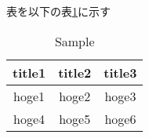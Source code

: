\documentclass[a4paper,10pt]{jsarticle}
\begin{document}
\noindent 表を以下の表\ref{tb:label2}に示す
\begin{table}[H]
    \caption{Sample}
    \label{tb:label2}                 
    \centering                     
    \begin{tabular}{c | c | c}
        \hline                        
        title1 & title2 & title3 \\          
        \hline \hline
        hoge1 & hoge2 & hoge3 \\
        hoge4 & hoge5 & hoge6 \\
        \hline
    \end{tabular}
\end{table}
\end{document}
